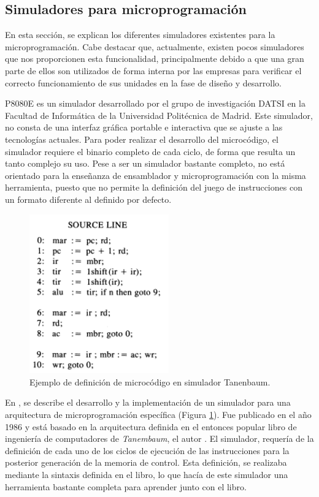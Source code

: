 \subsection{Simuladores para microprogramación}
\label{sec:simuladores_microprogramacion}

En esta sección, se explican los diferentes simuladores existentes para la microprogramación. Cabe destacar que, actualmente, existen pocos simuladores que nos proporcionen esta funcionalidad, principalmente debido a que una gran parte de ellos son utilizados de forma interna por las empresas para verificar el correcto funcionamiento de sus unidades en la fase de diseño y desarrollo. 

P8080E \cite{p8080E} es un simulador desarrollado por el grupo de investigación DATSI en la Facultad de Informática de la Universidad Politécnica de Madrid. Este simulador, no consta de una interfaz gráfica portable e interactiva que se ajuste a las tecnologías actuales. Para poder realizar el desarrollo del microcódigo, el simulador requiere el binario completo de cada ciclo, de forma que resulta un tanto complejo su uso. Pese a ser un simulador bastante completo, no está orientado para la enseñanza de ensamblador y microprogramación con la misma herramienta, puesto que no permite la definición del juego de instrucciones con un formato diferente al definido por defecto.

\begin{figure}[htbp]
 	\centering
 	\includegraphics[width=6cm]{figures/ejemploTanenbaum}
 	\caption{Ejemplo de definición de microcódigo en simulador Tanenbaum.}
	\label{fig:tanenbaum_figure}
\end{figure}

En \cite{yen1986development}, se describe el desarrollo y la implementación de un simulador para una arquitectura de microprogramación específica (Figura \ref{fig:tanenbaum_figure}). Fue publicado en el año 1986 y está basado en la arquitectura definida en el entonces popular libro de ingeniería de computadores de \textit{Tanembaum}, el autor \cite{tanenbaum1984}. El simulador, requería de la definición de cada uno de los ciclos de ejecución de las instrucciones para la posterior generación de la memoria de control. Esta definición, se realizaba mediante la sintaxis definida en el libro, lo que hacía de este simulador una herramienta bastante completa para aprender junto con el libro. 


